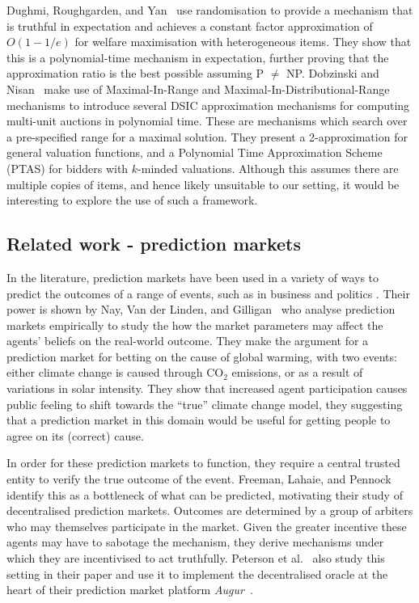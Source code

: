 \documentclass[10pt,a4paper]{article}
\theoremstyle{plain}
\theoremstyle{definition}
\begin{document}
	Dughmi, Roughgarden, and Yan~\cite{Dughmi2016} use randomisation to provide
	a mechanism that is truthful in expectation and achieves a constant factor
	approximation of $O(1-1/e)$ for welfare maximisation with heterogeneous
	items. They show that this is a polynomial-time mechanism in expectation,
	further proving that the approximation ratio is the best possible assuming
	P $\neq$ NP. Dobzinski and Nisan~\cite{Dobzinski2010} make use of
	Maximal-In-Range and Maximal-In-Distributional-Range~\cite{Dobzinski2006}
	mechanisms to introduce several DSIC approximation mechanisms for computing
	multi-unit auctions in polynomial time. These are mechanisms which search
	over a pre-specified range for a maximal solution. They present a
	2-approximation for general valuation functions, and a Polynomial Time
	Approximation Scheme (PTAS) for bidders with $k$-minded valuations.
	Although this assumes there are multiple copies of items, and hence likely
	unsuitable to our setting, it would be interesting to explore the use of
	such a framework.

	\subsection{Related work - prediction markets}

	In the literature, prediction markets have been used in a variety of ways
	to predict the outcomes of a range of events, such as in business and
	politics \cite{Spann2003, Berg2006}. Their power is shown by Nay, Van der
	Linden, and Gilligan~\cite{Nay2016} who analyse prediction markets
	empirically to study the how the market parameters may affect the agents'
	beliefs on the real-world outcome. They make the argument for a prediction
	market for betting on the cause of global warming, with two events: either
	climate change is caused through CO$_2$ emissions, or as a result of
	variations in solar intensity. They show that increased agent participation
	causes public feeling to shift towards the ``true'' climate change model,
	they suggesting that a prediction market in this domain would be useful for
	getting people to agree on its (correct) cause.

	In order for these prediction markets to function, they require a central
	trusted entity to verify the true outcome of the event. Freeman, Lahaie,
	and Pennock~\cite{Freeman2017} identify this as a bottleneck of what can be
	predicted, motivating their study of decentralised prediction markets.
	Outcomes are determined by a group of arbiters who may themselves
	participate in the market. Given the greater incentive these agents may
	have to sabotage the mechanism, they derive mechanisms under which they are
	incentivised to act truthfully. Peterson et al.~\cite{Peterson2015} also
	study this setting in their paper and use it to implement the decentralised
	oracle at the heart of their prediction market platform
	\emph{Augur}~\cite{Augur}.
\end{document}
